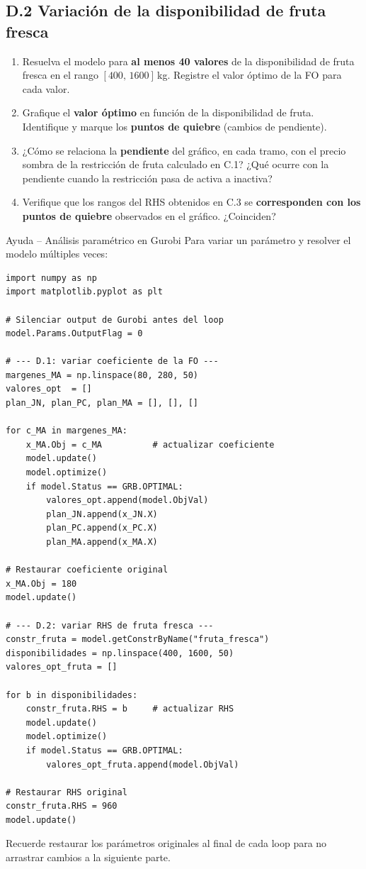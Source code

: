 \documentclass[12pt,a4paper]{article}
\begin{document}
\vspace{0.5em}

\subsection*{D.2 \quad Variación de la disponibilidad de fruta fresca}

\begin{enumerate}[label=\alph*), leftmargin=*, topsep=2pt]
    \item Resuelva el modelo para \textbf{al menos 40 valores} de la
          disponibilidad de fruta fresca en el rango $[400,\,1600]$\,kg.
          Registre el valor óptimo de la FO para cada valor.
    \item Grafique el \textbf{valor óptimo} en función de la disponibilidad
          de fruta. Identifique y marque los \textbf{puntos de quiebre}
          (cambios de pendiente).
    \item ¿Cómo se relaciona la \textbf{pendiente} del gráfico, en cada
          tramo, con el precio sombra de la restricción de fruta calculado
          en C.1? ¿Qué ocurre con la pendiente cuando la restricción pasa
          de activa a inactiva?
    \item Verifique que los rangos del RHS obtenidos en C.3 se
          \textbf{corresponden con los puntos de quiebre} observados en
          el gráfico. ¿Coinciden?
\end{enumerate}
\newpage
\begin{ayuda}{Ayuda -- Análisis paramétrico en Gurobi}
Para variar un parámetro y resolver el modelo múltiples veces:
\begin{lstlisting}
import numpy as np
import matplotlib.pyplot as plt

# Silenciar output de Gurobi antes del loop
model.Params.OutputFlag = 0

# --- D.1: variar coeficiente de la FO ---
margenes_MA = np.linspace(80, 280, 50)
valores_opt  = []
plan_JN, plan_PC, plan_MA = [], [], []

for c_MA in margenes_MA:
    x_MA.Obj = c_MA          # actualizar coeficiente
    model.update()
    model.optimize()
    if model.Status == GRB.OPTIMAL:
        valores_opt.append(model.ObjVal)
        plan_JN.append(x_JN.X)
        plan_PC.append(x_PC.X)
        plan_MA.append(x_MA.X)

# Restaurar coeficiente original
x_MA.Obj = 180
model.update()

# --- D.2: variar RHS de fruta fresca ---
constr_fruta = model.getConstrByName("fruta_fresca")
disponibilidades = np.linspace(400, 1600, 50)
valores_opt_fruta = []

for b in disponibilidades:
    constr_fruta.RHS = b     # actualizar RHS
    model.update()
    model.optimize()
    if model.Status == GRB.OPTIMAL:
        valores_opt_fruta.append(model.ObjVal)

# Restaurar RHS original
constr_fruta.RHS = 960
model.update()
\end{lstlisting}
Recuerde restaurar los parámetros originales al final de cada loop para no
arrastrar cambios a la siguiente parte.
\end{ayuda}
\end{document}
